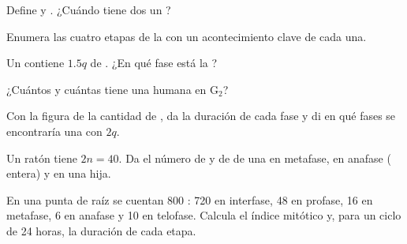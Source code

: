 \begin{exercise}[$\star$]\label{exo:g11:cell-cycle-mitosis:2}
Define  y . ¿Cuándo tiene dos  un
?
\end{exercise}

\begin{exercise}[$\star$]\label{exo:g11:cell-cycle-mitosis:3}
Enumera las cuatro etapas de la  con un acontecimiento clave de
cada una.
\end{exercise}

\begin{exercise}[$\star$]\label{exo:g11:cell-cycle-mitosis:4}
Un  contiene $1.5q$ de . ¿En qué fase está la ?
\end{exercise}

\begin{exercise}[$\star$]\label{exo:g11:cell-cycle-mitosis:5}
¿Cuántos  y cuántas  tiene una  humana en
$\mathrm{G_2}$?
\end{exercise}

\begin{exercise}[$\star\star$]\label{exo:g11:cell-cycle-mitosis:6}
Con la figura de la cantidad de , da la duración de cada fase y di
en qué fases se encontraría una  con $2q$.
\end{exercise}

\begin{exercise}[$\star\star$]\label{exo:g11:cell-cycle-mitosis:7}
Un ratón tiene $2n = 40$. Da el número de  y de  de
una  en metafase, en anafase ( entera) y en una 
hija.
\end{exercise}

\begin{exercise}[$\star\star$]\label{exo:g11:cell-cycle-mitosis:8}
En una punta de raíz se cuentan 800 : 720 en interfase, 48 en
profase, 16 en metafase, 6 en anafase y 10 en telofase. Calcula el
índice mitótico y, para un ciclo de 24 horas, la duración de cada
etapa.
\end{exercise}

